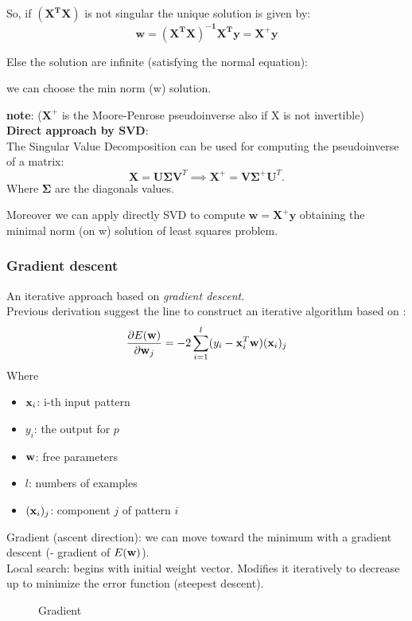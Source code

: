 \documentclass[../main.tex]{subfiles}
\begin{document}
So, if $ \mathbf{(X^TX)}$ is not singular the unique solution is given by:
$$ \mathbf{w = (X^TX)^{-1}X^Ty = X^+y} $$ 

Else the solution are infinite (satisfying the normal equation):
\begin{center}
    we can choose the min norm (w) solution.
\end{center}

\noindent\textbf{note}: ($\mathbf{X}^+$ is the Moore-Penrose pseudoinverse also if X is not invertible)\\

\noindent \textbf{Direct approach by SVD}:\\
The Singular Value Decomposition can be used for computing the pseudoinverse of a matrix:
\[
    \boldsymbol{X} = \boldsymbol{U}\boldsymbol{\Sigma}\boldsymbol{V}^T \implies  \boldsymbol{X}^+ = \boldsymbol{V}\boldsymbol{\Sigma}^+\boldsymbol{U}^T
.\] 
Where $\boldsymbol{\Sigma}$ are the diagonals values.

Moreover we can apply directly SVD to compute $ \mathbf{w =X^+y} $ obtaining the minimal norm (on w) solution of least squares problem.
\subsubsection{Gradient descent}
An iterative approach based on  \emph{gradient descent}.\\
Previous derivation suggest the line to construct an iterative algorithm based on :
$$\frac{\partial E(\mathbf{w})}{\partial\mathbf{w}_j} = -2\sum_{i = 1}^{l} (y_i - \bold{x}_i^T\bold{w})(\bold{x}_i)_j$$
Where
\begin{itemize}
    \item $\bold{x}_i$: i-th input pattern
    \item $y_i$: the output for $p$
    \item $\bold{w}$: free parameters
    \item $l$: numbers of examples
    \item $(\bold{x}_i)_j$: component $j$ of pattern $i$
\end{itemize}
Gradient (ascent direction): we can move toward the minimum with a gradient descent (- gradient of $E(\bold{w})$).\\
Local search: begins with initial weight vector. Modifies it iteratively to decrease up to minimize the error function (steepest descent).
\begin{figure}[H]
  \centering
  \hfill
  \caption{Gradient}
\end{figure}
\end{document}
